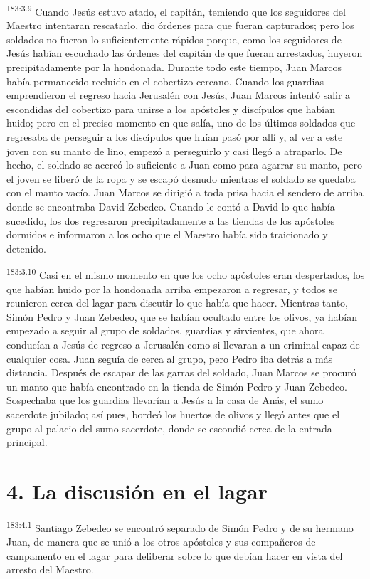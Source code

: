 \par 
\textsuperscript{183:3.9} Cuando Jesús estuvo atado, el capitán, temiendo que los seguidores del Maestro intentaran rescatarlo, dio órdenes para que fueran capturados; pero los soldados no fueron lo suficientemente rápidos porque, como los seguidores de Jesús habían escuchado las órdenes del capitán de que fueran arrestados, huyeron precipitadamente por la hondonada. Durante todo este tiempo, Juan Marcos había permanecido recluido en el cobertizo cercano. Cuando los guardias emprendieron el regreso hacia Jerusalén con Jesús, Juan Marcos intentó salir a escondidas del cobertizo para unirse a los apóstoles y discípulos que habían huido; pero en el preciso momento en que salía, uno de los últimos soldados que regresaba de perseguir a los discípulos que huían pasó por allí y, al ver a este joven con su manto de lino, empezó a perseguirlo y casi llegó a atraparlo. De hecho, el soldado se acercó lo suficiente a Juan como para agarrar su manto, pero el joven se liberó de la ropa y se escapó desnudo mientras el soldado se quedaba con el manto vacío. Juan Marcos se dirigió a toda prisa hacia el sendero de arriba donde se encontraba David Zebedeo. Cuando le contó a David lo que había sucedido, los dos regresaron precipitadamente a las tiendas de los apóstoles dormidos e informaron a los ocho que el Maestro había sido traicionado y detenido.

\par 
\textsuperscript{183:3.10} Casi en el mismo momento en que los ocho apóstoles eran despertados, los que habían huido por la hondonada arriba empezaron a regresar, y todos se reunieron cerca del lagar para discutir lo que había que hacer. Mientras tanto, Simón Pedro y Juan Zebedeo, que se habían ocultado entre los olivos, ya habían empezado a seguir al grupo de soldados, guardias y sirvientes, que ahora conducían a Jesús de regreso a Jerusalén como si llevaran a un criminal capaz de cualquier cosa. Juan seguía de cerca al grupo, pero Pedro iba detrás a más distancia. Después de escapar de las garras del soldado, Juan Marcos se procuró un manto que había encontrado en la tienda de Simón Pedro y Juan Zebedeo. Sospechaba que los guardias llevarían a Jesús a la casa de Anás, el sumo sacerdote jubilado; así pues, bordeó los huertos de olivos y llegó antes que el grupo al palacio del sumo sacerdote, donde se escondió cerca de la entrada principal.

\section*{4. La discusión en el lagar}
\par 
\textsuperscript{183:4.1} Santiago Zebedeo se encontró separado de Simón Pedro y de su hermano Juan, de manera que se unió a los otros apóstoles y sus compañeros de campamento en el lagar para deliberar sobre lo que debían hacer en vista del arresto del Maestro.

